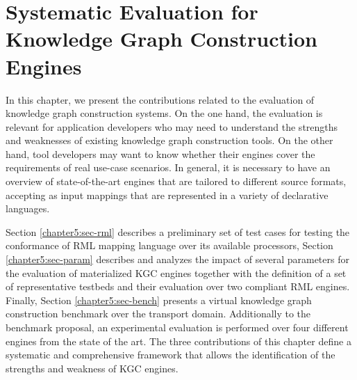 \chapter{Systematic Evaluation for Knowledge Graph Construction Engines}
\label{chapter:evaluation}
In this chapter, we present the contributions related to the evaluation of knowledge graph construction systems. On the one hand, the evaluation is relevant for application developers who may need to understand the strengths and weaknesses of existing knowledge graph construction tools. On the other hand, tool developers may want to know whether their engines cover the requirements of real use-case scenarios. In general, it is necessary to have an overview of state-of-the-art engines that are tailored to different source formats, accepting as input mappings that are represented in a variety of declarative languages. 

 Section \ref{chapter5:sec-rml} describes a preliminary set of test cases for testing the conformance of RML mapping language over its available processors, Section \ref{chapter5:sec-param} describes and analyzes the impact of several parameters for the evaluation of materialized KGC engines together with the definition of a set of representative testbeds and their evaluation over two compliant RML engines. Finally, Section \ref{chapter5:sec-bench} presents a virtual knowledge graph construction benchmark over the transport domain. Additionally to the benchmark proposal, an experimental evaluation is performed over four different engines from the state of the art. The three contributions of this chapter define a systematic and comprehensive framework that allows the identification of the strengths and weakness of KGC engines.









